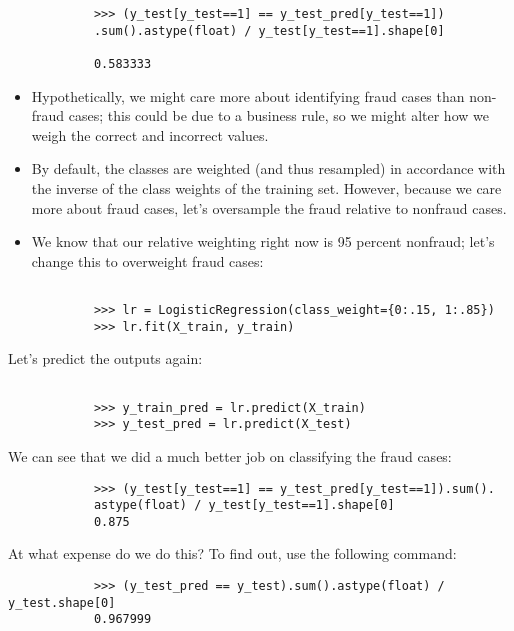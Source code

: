 \documentclass[SKL-MASTER.tex]{subfiles}
\begin{document}
	{
		\Large
		\begin{framed}
			\begin{verbatim}
			>>> (y_test[y_test==1] == y_test_pred[y_test==1])
			.sum().astype(float) / y_test[y_test==1].shape[0]
			
			0.583333
			\end{verbatim}
		\end{framed}
	}
	\newpage
	\begin{itemize}
		\item Hypothetically, we might care more about identifying fraud cases than non-fraud cases;
		this could be due to a business rule, so we might alter how we weigh the correct and
		incorrect values.
		\item By default, the classes are weighted (and thus resampled) in accordance with the inverse
		of the class weights of the training set. However, because we care more about fraud cases,
		let's oversample the fraud relative to nonfraud cases.
		\item We know that our relative weighting right now is 95 percent nonfraud; let's change this to
		overweight fraud cases:
	\end{itemize}
	{
		\Large
		\begin{framed}
			\begin{verbatim}
			
			>>> lr = LogisticRegression(class_weight={0:.15, 1:.85})
			>>> lr.fit(X_train, y_train)
			\end{verbatim}
		\end{framed}
	}
	\newpage
	Let's predict the outputs again:
	{
		\Large
		\begin{framed}
			\begin{verbatim}
			
			>>> y_train_pred = lr.predict(X_train)
			>>> y_test_pred = lr.predict(X_test)
			\end{verbatim}
		\end{framed}
	}
	\noindent We can see that we did a much better job on classifying the fraud cases:
	{\Large
		\begin{framed}
			\begin{verbatim}
			>>> (y_test[y_test==1] == y_test_pred[y_test==1]).sum().
			astype(float) / y_test[y_test==1].shape[0]
			0.875
			\end{verbatim}
		\end{framed}
	}
	\noindent At what expense do we do this? To find out, use the following command:
	{\Large
		\begin{framed}
			\begin{verbatim}
			>>> (y_test_pred == y_test).sum().astype(float) / y_test.shape[0]
			0.967999
			\end{verbatim}
		\end{framed}
	}
	
\end{document}
